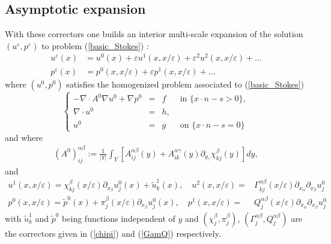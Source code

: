 \documentclass[11pt, reqno]{amsart}
\theoremstyle{definition}
\theoremstyle{remark}
\numberwithin{equation}{section}
\begin{document}
	
	
	
	
	
	\subsection{Asymptotic expansion}
	With these  correctors one builds an interior multi-scale expansion of the solution $(u^\varepsilon, p^\varepsilon)$ to problem (\ref{basic_Stokes}) :
	\begin{align}
		u^\varepsilon(x)&=u^0(x)+ \varepsilon	u^1(x,x/\varepsilon)  + \varepsilon^2 u^2(x,x/\varepsilon)   +...\label{expansu}\\
		p^\varepsilon(x)&=  p^0(x,x/\varepsilon) +\varepsilon p^1(x,x/\varepsilon)  + ...\label{expansp}
	\end{align} 
	where $(u^0,p^0)$ satisfies the homogenized problem associated to (\ref{basic_Stokes})
		\begin{equation*}
		\left\{
		\begin{array}{rcll}
			-\nabla\cdot A^0\nabla u^0 +  \nabla p^0&=& f& \mbox{ in } \{ x\cdot n-s>0 \},\\
			\nabla\cdot u^0&=& h,&\\
			u^0&=& g
			&\mbox{ on } \{ x\cdot n-s=0 \}
		\end{array}
		\right. 
	\end{equation*}
	and where
		\begin{align*}
	(A^0)_{ij}^{\alpha\beta}:= \frac{1}{|Y|}\int_Y [A^{\alpha\beta}_{ij}(y) + A^{\alpha\gamma}_{ik}(y)\partial_{y_{\gamma}} \chi^{\beta}_{kj}(y)] dy,
	\end{align*}
and
	\begin{align}
		u^1(x,x/\varepsilon) =	\chi^{\beta}_{kj}(x/\varepsilon) \partial _{x_{\beta}} u^0_j  (x)	+ \tilde{u}_k^1(x),\quad u^2(x,x/\varepsilon)=& \Gamma^{\alpha\beta}_{kj}(x/\varepsilon)\partial_{x_{\alpha}}\partial_{x_{\beta}} u^0_j  \\
		p^0(x,x/\varepsilon)= \tilde{p}^0(x)+ \pi^{\beta}_{j}(x/\varepsilon) \partial_{x_{\beta}} u^0_j(x),\quad p^1(x,x/\varepsilon) =& Q^{\alpha\beta}_{j}(x/\varepsilon)\partial_{x_{\alpha}}\partial_{x_{\beta}} u^0_j 
	\end{align} 
	with 
	$ \tilde{u}_k^1$ and $ \tilde{p}^0$ being functions independent of $y$ 
and  $(\chi^{\beta}_{j},\pi^{\beta}_{j})$, $(\Gamma^{\alpha\beta}_{j}, Q^{\alpha\beta}_{j})$ are the correctors given in (\ref{chipi}) and (\ref{GamQ}) respectively.
\end{document}

